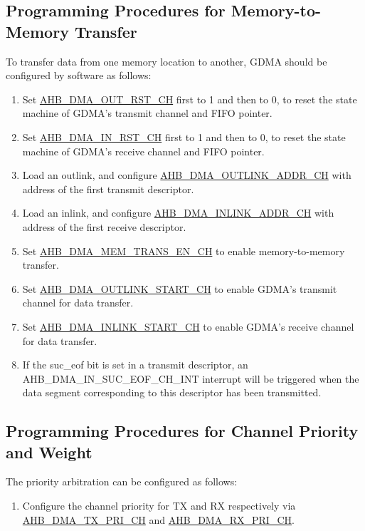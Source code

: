 \documentclass[main\_\_EN.tex]{subfiles}
\begin{document}
\subsection{Programming Procedures for Memory-to-Memory Transfer}
To transfer data from one memory location to another, GDMA should be configured by software as follows:
\begin{enumerate}
    \item Set \hyperref[fielddesc:AHBDMAOUTRSTCHN]{AHB\_DMA\_OUT\_RST\_CH} first to 1 and then to 0, to reset the state machine of GDMA's transmit channel and FIFO pointer.
    \item Set \hyperref[fielddesc:AHBDMAINRSTCHN]{AHB\_DMA\_IN\_RST\_CH} first to 1 and then to 0, to reset the state machine of GDMA's receive channel and FIFO pointer.
    \item Load an outlink, and configure \hyperref[fielddesc:AHBDMAOUTLINKADDRCHN]{AHB\_DMA\_OUTLINK\_ADDR\_CH} with address of the first transmit descriptor.
    \item Load an inlink, and configure \hyperref[fielddesc:AHBDMAINLINKADDRCHN]{AHB\_DMA\_INLINK\_ADDR\_CH} with address of the first receive descriptor.
    \item Set \hyperref[fielddesc:AHBDMAMEMTRANSENCHN]{AHB\_DMA\_MEM\_TRANS\_EN\_CH} to enable memory-to-memory transfer.
    \item Set \hyperref[fielddesc:AHBDMAOUTLINKSTARTCHN]{AHB\_DMA\_OUTLINK\_START\_CH} to enable GDMA's transmit channel for data transfer.
    \item Set \hyperref[fielddesc:AHBDMAINLINKSTARTCHN]{AHB\_DMA\_INLINK\_START\_CH} to enable GDMA's receive channel for data transfer.
    \item If the suc\_eof bit is set in a transmit descriptor, an AHB\_DMA\_IN\_SUC\_EOF\_CH\_INT interrupt will be triggered when the data segment corresponding to this descriptor has been transmitted.
\end{enumerate}

\subsection{Programming Procedures for Channel Priority and Weight}

The priority arbitration can be configured as follows:
\begin{enumerate}
    \item Configure the channel priority for TX and RX respectively via \hyperref[fielddesc:AHBDMATXPRICHN]{AHB\_DMA\_TX\_PRI\_CH} and \hyperref[fielddesc:AHBDMARXPRICHN]{AHB\_DMA\_RX\_PRI\_CH}.
\end{enumerate}
\end{document}
